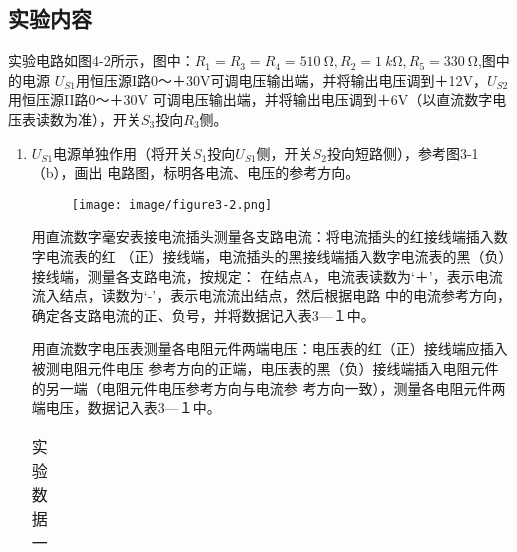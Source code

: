 \documentclass[UTF8]{article}
\begin{document}
        \subsection{实验内容}
            \noindent\hspace{2em}
            实验电路如图4-2所示，图中：$R_1 = R_3 = R_4 = \SI{510}{\ohm}, R_2 = \SI{1}{k\ohm}, R_5 = \SI{330}{\ohm}$,图中的电源
            $U_{S1}$用恒压源I路0～＋30V可调电压输出端，并将输出电压调到＋12V，$U_{S2}$用恒压源II路0～＋30V
            可调电压输出端，并将输出电压调到＋6V（以直流数字电压表读数为准），开关$S_3$投向$R_3$侧。
            \begin{enumerate}[label=\textbf{\arabic*}.]
                \item $U_{S1}$电源单独作用（将开关$S_1$投向$U_{S1}$侧，开关$S_2$投向短路侧），参考图3-1（b），画出
                电路图，标明各电流、电压的参考方向。 
                \begin{figure}[H]
                    \centering
                    \texttt{[image: image/figure3-2.png]}
                    \caption{}
                \end{figure}
                \par
                \noindent\hspace{2em}用直流数字毫安表接电流插头测量各支路电流：将电流插头的红接线端插入数字电流表的红
                （正）接线端，电流插头的黑接线端插入数字电流表的黑（负）接线端，测量各支路电流，按规定：
                在结点A，电流表读数为‘＋’，表示电流流入结点，读数为‘-’，表示电流流出结点，然后根据电路
                中的电流参考方向，确定各支路电流的正、负号，并将数据记入表3—１中。 
                \par
                \noindent\hspace{2em}用直流数字电压表测量各电阻元件两端电压：电压表的红（正）接线端应插入被测电阻元件电压
                参考方向的正端，电压表的黑（负）接线端插入电阻元件的另一端（电阻元件电压参考方向与电流参
                考方向一致），测量各电阻元件两端电压，数据记入表3—１中。 
                \begin{table}[H]
                    \centering
                    \caption{实验数据一}
                    \begin{tabularx}{\textwidth}{
                        |>{\centering\arraybackslash}l
                        |>{\centering\arraybackslash}X
                        |>{\centering\arraybackslash}X
                        |>{\centering\arraybackslash}X
                        |>{\centering\arraybackslash}X
}
\end{tabularx}
\end{table}
\end{enumerate}
\end{document}
